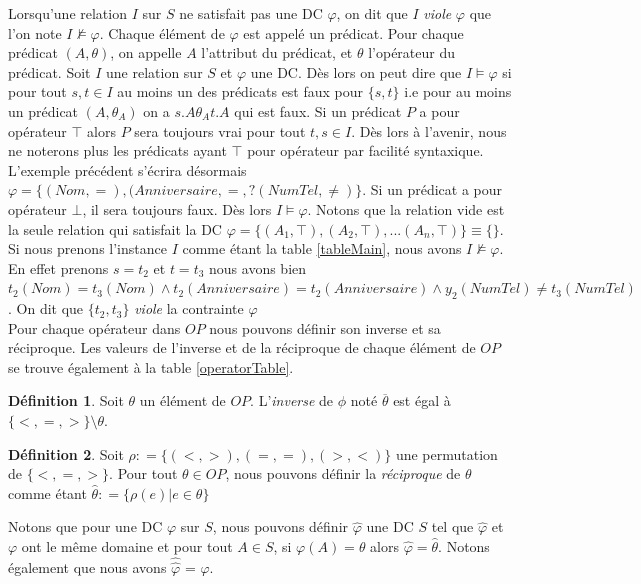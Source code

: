\documentclass[letterpaper, 12pt]{report}
\theoremstyle{definition}
\newtheorem{mydef}{Définition}
\begin{document}
Lorsqu'une relation $I$ sur $S$ ne satisfait pas une DC $\varphi$, on dit que $I$ \emph{viole} $\varphi$ que l'on note $I \not\models \varphi$. Chaque élément de $\varphi$ est appelé un prédicat. Pour chaque prédicat $(A,\theta)$, on appelle $A$ l'attribut du prédicat, et $\theta$ l'opérateur du prédicat.  Soit $I$ une relation sur $S$ et $\varphi$ une DC. Dès lors on peut dire que $I \models \varphi$ si pour tout $s,t \in I$ au moins un des prédicats est faux pour $\{s,t\}$ i.e pour au moins un prédicat $(A,\theta_A)$ on a $s.A \theta_A t.A$ qui est faux. Si un prédicat $P$ a pour opérateur $\top$ alors $P$ sera toujours vrai pour tout $t,s \in I$. Dès lors à l'avenir, nous ne noterons plus les prédicats ayant $\top$ pour opérateur par facilité syntaxique. L'exemple précédent s'écrira désormais $\varphi =\{(Nom,=),(Anniversaire,=,?(NumTel,\neq)\}$. Si un prédicat a pour opérateur $\bot$, il sera toujours faux. Dès lors $I \models \varphi$. Notons que la relation vide est la seule relation qui satisfait la DC $\varphi = \{(A_1,\top),(A_2,\top),...(A_n,\top)\} \equiv \{ \}$.\\

 Si nous prenons l'instance $I$ comme étant la table \ref{tableMain}, nous avons $I \not\models \varphi$. En effet prenons $s=t_2$ et $t=t_3$ nous avons bien $t_2(Nom) = t_3(Nom) \wedge t_2(Anniversaire) = t_2(Anniversaire) \wedge y_2(NumTel) \neq t_3(NumTel)$. On dit que $\{ t_2,t_3 \}$ \emph{viole} la contrainte $\varphi$\\ 

Pour chaque opérateur dans $OP$ nous pouvons définir son inverse et sa réciproque. Les valeurs de l'inverse et de la réciproque de chaque élément de $OP$ se trouve également à la table \ref{operatorTable}.
\begin{mydef}
Soit $\theta$ un élément de $OP$. L'\emph{inverse} de $\phi$ noté $\overline{\theta}$ est égal à $\{<,=,>\}\setminus \theta$.

\end{mydef}

\begin{mydef}

Soit $\rho \mathrel{\mathop:}= \{ (<,>),(=,=),(>,<) \}$ une permutation de $\{<,=,> \}$. Pour tout $\theta \in OP$, nous pouvons définir la \emph{réciproque} de $\theta$ comme étant $\hat{\theta} \mathrel{\mathop:}= \{ \rho(e) | e \in \theta \}$
\end{mydef}

Notons que pour une DC $\varphi$ sur $S$, nous pouvons définir $\hat{\varphi}$ une DC $S$ tel que $\hat{\varphi}$ et $\varphi$ ont le même domaine et pour tout $A \in S$, si $\varphi(A) = \theta$ alors $\hat{\varphi} = \hat{\theta}$. Notons également que nous avons $\hat{\hat{\varphi}}$ = $\varphi$.\\
\end{document}
